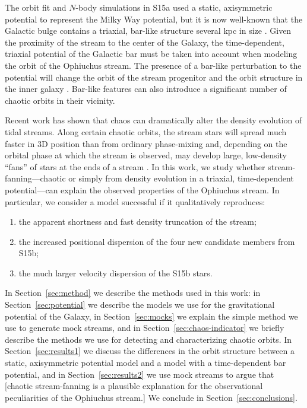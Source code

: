 \documentclass[letterpaper,12pt,preprint]{aastex}
\begin{document}
The orbit fit and $N$-body simulations in S15a used a static, axisymmetric potential to represent the Milky Way potential, but it is now well-known that the Galactic bulge contains a triaxial, bar-like structure several kpc in size \citep[e.g.,][]{blitzXX, wegg13, MANY}. Given the proximity of the stream to the center of the Galaxy, the time-dependent, triaxial potential of the Galactic bar must be taken into account when modeling the orbit of the Ophiuchus stream. The presence of a bar-like perturbation to the potential will change the orbit of the stream progenitor and the orbit structure in the inner galaxy \citep{athanassoula, portail15b, zotos12}. Bar-like features can also introduce a significant number of chaotic orbits in their vicinity\citep{weinberg15}.

Recent work has shown that chaos can dramatically alter the density evolution of tidal streams. Along certain chaotic orbits, the stream stars will spread much faster in 3D position than from ordinary phase-mixing and, depending on the orbital phase at which the stream is observed, may develop large, low-density ``fans'' of stars at the ends of a stream \citep{apw15-chaos}. In this work, we study whether stream-fanning---chaotic or simply from density evolution in a triaxial, time-dependent potential---can explain the observed properties of the Ophiuchus stream. In particular, we consider a model successful if it qualitatively reproduces:
\begin{enumerate}
	\item the apparent shortness and fast density truncation of the stream;
	\item the increased positional dispersion of the four new candidate members from S15b;
	\item the much larger velocity dispersion of the S15b stars.
\end{enumerate}

In Section~\ref{sec:method} we describe the methods used in this work: in Section~\ref{sec:potential} we describe the models we use for the gravitational potential of the Galaxy, in Section~\ref{sec:mocks} we explain the simple method we use to generate mock streams, and in Section~\ref{sec:chaos-indicator} we briefly describe the methods we use for detecting and characterizing chaotic orbits. In Section~\ref{sec:results1} we discuss the differences in the orbit structure between a static, axisymmetric potential model and a model with a time-dependent bar potential, and in Section~\ref{sec:results2} we use mock streams to argue that [chaotic stream-fanning is a plausible explanation for the observational peculiarities of the Ophiuchus stream.] We conclude in Section~\ref{sec:conclusions}.
\end{document}
